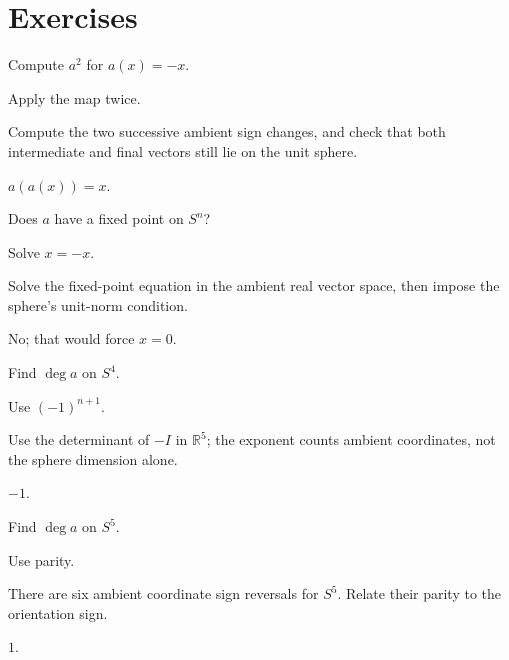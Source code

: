 \section{Exercises}

\begin{exercise}\label{exr:viii04-01}
Compute \(a^2\) for \(a(x)=-x\).
\end{exercise}
\begin{hint}
Apply the map twice.

Compute the two successive ambient sign changes, and check that both intermediate and final vectors still lie on the unit sphere.
\end{hint}
\begin{solution}
\(a(a(x))=x\).
\end{solution}

\begin{exercise}\label{exr:viii04-02}
Does \(a\) have a fixed point on \(S^n\)?
\end{exercise}
\begin{hint}
Solve \(x=-x\).

Solve the fixed-point equation in the ambient real vector space, then impose the sphere's unit-norm condition.
\end{hint}
\begin{solution}
No; that would force \(x=0\).
\end{solution}

\begin{exercise}\label{exr:viii04-03}
Find \(\deg a\) on \(S^4\).
\end{exercise}
\begin{hint}
Use \((-1)^{n+1}\).

Use the determinant of \(-I\) in \(\mathbb R^5\); the exponent counts ambient coordinates, not the sphere dimension alone.
\end{hint}
\begin{solution}
\(-1\).
\end{solution}

\begin{exercise}\label{exr:viii04-04}
Find \(\deg a\) on \(S^5\).
\end{exercise}
\begin{hint}
Use parity.

There are six ambient coordinate sign reversals for \(S^5\). Relate their parity to the orientation sign.
\end{hint}
\begin{solution}
\(1\).
\end{solution}


